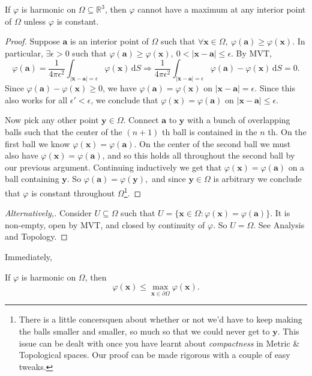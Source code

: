 \begin{proposition}
    If $ \varphi $ is harmonic on $ \Omega \subseteq \mathbb{R}^{3} $, then $ \varphi $ cannot have a maximum at any interior point of $ \Omega $ unless $ \varphi $ is constant.
\end{proposition}
\begin{proof}
    Suppose $ \mathbf{a} $ is an interior point of $ \Omega $ such that $ \forall \mathbf{x}\in \Omega,\ \varphi(\mathbf{a})\ge \varphi(\mathbf{x}) $. In particular, $ \exists \epsilon>0 $ such that $ \varphi(\mathbf{a})\ge \varphi(\mathbf{x}),\ 0<|\mathbf{x}-\mathbf{a}|\le\epsilon $. By MVT, 
    \[
        \varphi(\mathbf{a}) = \frac{1}{4\pi \epsilon^2}\int_{|\mathbf{x}-\mathbf{a}|=\epsilon} \varphi(\mathbf{x}) \,\mathrm{d}S \Longrightarrow \frac{1}{4\pi \epsilon^2}\int_{|\mathbf{x}-\mathbf{a}|=\epsilon} \varphi(\mathbf{a})-\varphi(\mathbf{x}) \,\mathrm{d}S=0.
    \]
    Since $ \varphi(\mathbf{a})-\varphi(\mathbf{x})\ge 0 $, we have $ \varphi(\mathbf{a})=\varphi(\mathbf{x}) $ on $ |\mathbf{x}-\mathbf{a}|=\epsilon $. Since this also works for all $ \epsilon'<\epsilon $, we conclude that $ \varphi(\mathbf{x})=\varphi(\mathbf{a}) $ on $ |\mathbf{x}-\mathbf{a}|\le \epsilon $.

    Now pick any other point $\mathbf{y} \in \Omega$. Connect $\mathbf{a}$ to $\mathbf{y}$ with a bunch of overlapping balls such that the center of the $(n+1)$ th ball is contained in the $n$ th. On the first ball we know $\varphi(\mathbf{x})=\varphi(\mathbf{a})$. On the center of the second ball we must also have $\varphi(\mathbf{x})=\varphi(\mathbf{a})$, and so this holds all throughout the second ball by our previous argument. Continuing inductively we get that $\varphi(\mathbf{x})=\varphi(\mathbf{a})$ on a ball containing $\mathbf{y}$. So $\varphi(\mathbf{a})=\varphi(\mathbf{y}),$ and since $\mathbf{y} \in \Omega$ is arbitrary we conclude that $\varphi$ is constant throughout $\Omega$\footnote{There is a little concersquen about whether or not we’d have to keep making the balls smaller and smaller, so much so that we could never get to $\mathbf{y}$. This issue can be dealt with once you have learnt about \textit{compactness} in Metric \& Topological spaces. Our proof can be made rigorous with a couple of easy tweaks.}.
\end{proof}
\begin{proof}[Alternatively,]
    Consider $ U \subseteq \Omega $ such that $ U=\{\mathbf{x}\in \Omega: \varphi(\mathbf{x})=\varphi(\mathbf{a})\} $. It is non-empty, open by MVT, and closed by continuity of $ \varphi $. So $ U=\Omega $. See Analysis and Topology.
\end{proof}
Immediately,
\begin{corollary}
    If $ \varphi $ is harmonic on $ \Omega $, then 
    \[
        \varphi(\mathbf{x}) \le \max _{\mathbf{x} \in \partial \Omega} \varphi(\mathbf{x}).
    \]
\end{corollary}

